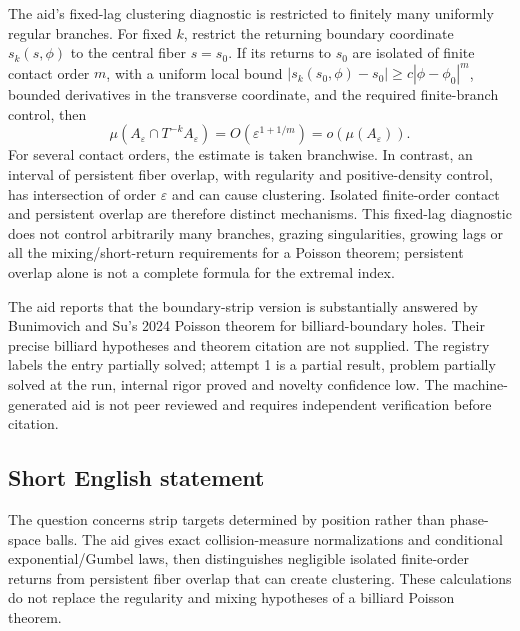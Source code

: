 \documentclass[11pt]{article}
\begin{document}
The aid's fixed-lag clustering diagnostic is restricted to finitely many uniformly regular branches. For fixed \(k\), restrict the returning boundary coordinate \(s_k(s,\phi)\) to the central fiber \(s=s_0\). If its returns to \(s_0\) are isolated of finite contact order \(m\), with a uniform local bound \(|s_k(s_0,\phi)-s_0|\ge c|\phi-\phi_0|^m\), bounded derivatives in the transverse coordinate, and the required finite-branch control, then
\[
\mu(A_\varepsilon\cap T^{-k}A_\varepsilon)=O(\varepsilon^{1+1/m})=o(\mu(A_\varepsilon)).
\]
For several contact orders, the estimate is taken branchwise. In contrast, an interval of persistent fiber overlap, with regularity and positive-density control, has intersection of order \(\varepsilon\) and can cause clustering. Isolated finite-order contact and persistent overlap are therefore distinct mechanisms. This fixed-lag diagnostic does not control arbitrarily many branches, grazing singularities, growing lags or all the mixing/short-return requirements for a Poisson theorem; persistent overlap alone is not a complete formula for the extremal index.

The aid reports that the boundary-strip version is substantially answered by Bunimovich and Su's 2024 Poisson theorem for billiard-boundary holes. Their precise billiard hypotheses and theorem citation are not supplied. The registry labels the entry partially solved; attempt 1 is a partial result, problem partially solved at the run, internal rigor proved and novelty confidence low. The machine-generated aid is not peer reviewed and requires independent verification before citation.
\subsection{Short English statement}
The question concerns strip targets determined by position rather than phase-space balls. The aid gives exact collision-measure normalizations and conditional exponential/Gumbel laws, then distinguishes negligible isolated finite-order returns from persistent fiber overlap that can create clustering. These calculations do not replace the regularity and mixing hypotheses of a billiard Poisson theorem.
\end{document}
